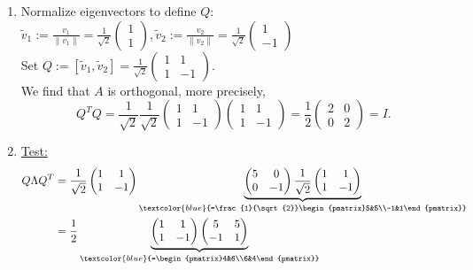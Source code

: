 {\begin{enumerate}
\begin{enumerate}
\begin{enumerate}
	\end{enumerate}
	\item Normalize eigenvectors to define $Q$:\\
	$\tilde{v}_1:=\frac{v_1}{\| v_1\|}=\frac{1}{\sqrt{2}}\begin{pmatrix}1\\1\end{pmatrix}, \tilde{v}_2:=\frac{v_2}{\| v_2\|}=\frac{1}{\sqrt{2}}\begin{pmatrix}1\\-1\end{pmatrix}$\\
	Set $Q:=[\tilde{v}_1, \tilde{v}_2] = \frac{1}{\sqrt{2}}\begin{pmatrix}1&1\\1&-1\end{pmatrix}$.\\
	We find that $A$ is orthogonal, more precisely, $$Q^TQ =\frac{1}{\sqrt{2}}\frac{1}{\sqrt{2}}\begin{pmatrix}1&1\\1&-1\end{pmatrix}\begin{pmatrix}1&1\\1&-1\end{pmatrix}=\frac{1}{2}\begin{pmatrix}2&0\\0&2\end{pmatrix} = I.$$
	\item 
	\underline{Test:} 
	\begin{align*} 
	Q\Lambda Q^T &=\frac{1}{\sqrt{2}}\begin{pmatrix} 1&1\\1&-1\end{pmatrix}\underbrace{\begin{pmatrix}5&0\\0&-1\end{pmatrix}\frac{1}{\sqrt{2}}\begin{pmatrix}1&1\\1&-1\end{pmatrix}}_{\textcolor{blue}{=\frac{1}{\sqrt{2}}\begin{pmatrix}5&5\\-1&1\end{pmatrix}}}\\
	&=\frac{1}{2}\underbrace{\begin{pmatrix}1&1\\1&-1\end{pmatrix}\begin{pmatrix}5&5\\-1&1\end{pmatrix}}_{\textcolor{blue}{=\begin{pmatrix}4&6\\6&4\end{pmatrix}}}\\

\end{align*}
\end{enumerate}
\end{enumerate}}
